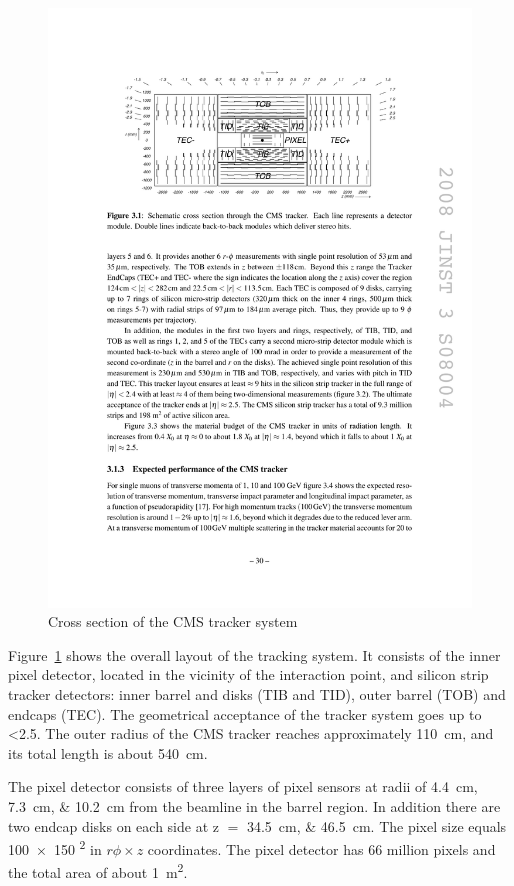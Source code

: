 \begin{figure}[htbp]
  \centering
  \leavevmode
  \includegraphics[width=\columnwidth]{tracker}
  \caption{Cross section of the CMS tracker system \autocite{CMS}}
  \label{fig:tracker}
\end{figure}

Figure~\ref{fig:tracker} shows the overall layout of the tracking system. It consists of the inner pixel detector,
located in the vicinity of the interaction point, and silicon strip tracker detectors: inner barrel and disks (TIB and
TID), outer barrel (TOB) and endcaps (TEC). The geometrical acceptance of the tracker system goes up to \abs\eta
\num{<2.5}. The outer radius of the CMS tracker reaches approximately \SI{110}{\cm}, and its total length is about
\SI{540}{\cm}.

The pixel detector consists of three layers of pixel sensors at radii of \SIlist{4.4;7.3;10.2}{\cm} from the beamline in
the barrel region. In addition there are two endcap disks on each side at \abs z $=$ \SIlist{34.5;46.5}{\cm}. The pixel
size equals \num{100x150} \si{\micron\squared} in $r \phi \times z$ coordinates. The pixel detector has 66 million
pixels and the total area of about \SI{1}{\m\squared}.

